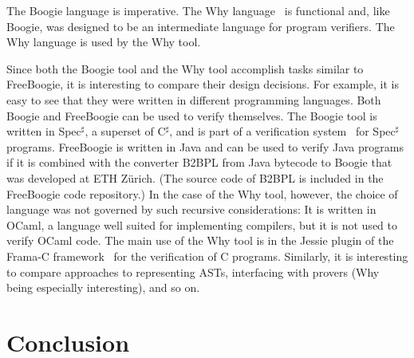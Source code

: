 \documentclass{llncs}
\newcommand{\csharp}{C$^\sharp$\xspace}
\newcommand{\specsharp}{Spec$^\sharp$\xspace}
\begin{document}
The Boogie language is imperative. The Why
language~\cite{filliatre2007why} is functional and, like
Boogie, was designed to be an intermediate language for program
verifiers. The Why language is used by the Why tool.

Since both the Boogie tool and the Why tool accomplish tasks
similar to FreeBoogie, it is interesting to compare their design
decisions. For example, it is easy to see that they were written
in different programming languages. Both Boogie and FreeBoogie
can be used to verify themselves. The Boogie tool is written in
\specsharp, a superset of \csharp, and is part of a verification
system~\cite{barnett2005spec} for \specsharp programs. FreeBoogie
is written in Java and can be used to verify Java programs if it
is combined with the converter B2BPL from Java bytecode to Boogie
that was developed at ETH Z\"urich. (The source code of B2BPL
is included in the FreeBoogie code repository.) In the case of
the Why tool, however, the choice of language was not governed
by such recursive considerations: It is written in OCaml, a
language well suited for implementing compilers, but it is not
used to verify OCaml code. The main use of the Why tool is in
the Jessie plugin of the Frama-C framework~\cite{framac} for
the verification of C programs. Similarly, it is interesting to
compare approaches to representing ASTs, interfacing with provers
(Why being especially interesting), and so on.

\section{Conclusion} %



\end{document}
